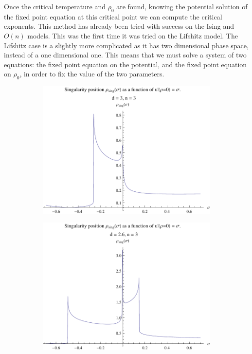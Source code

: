 Once the critical temperature and $\rho_0$ are found, knowing the potential solution of the fixed point equation at this critical point we can compute the critical exponents. This method has already been tried with success on the Ising \cite{CodelloIsing} and $O(n)$ \cite{CodelloOn} models. This was the first time it was tried on the Lifshitz model.
 The Lifshitz case is a slightly more complicated as it has two dimensional phase space, instead of a one dimensional one. This means that we must solve a system of two equations: the fixed point equation on the potential, and the fixed point equation on $\rho_0$, in order to fix the value of the two parameters.

\begin{figure}[htp]
\centering
\begin{subfigure}{.55\textwidth}
	\centering
	\includegraphics[width=.9\linewidth]{img/chap4/on_d3_n3.pdf}
	\caption{}
	\label{on_d_3}
	\end{subfigure}%
\begin{subfigure}{.55\textwidth}
	\centering
	\includegraphics[width=.9\linewidth]{img/chap4/on_d2p6_n3.pdf}

\end{subfigure}
\end{figure}
